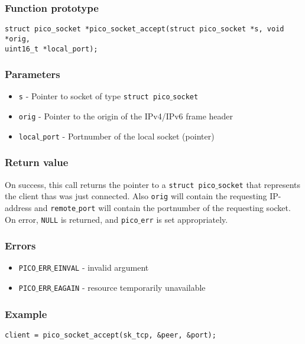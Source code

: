 \subsubsection*{Function prototype}
\begin{verbatim}
struct pico_socket *pico_socket_accept(struct pico_socket *s, void *orig,
uint16_t *local_port);
\end{verbatim}

\subsubsection*{Parameters}
\begin{itemize}[noitemsep]
\item \texttt{s} - Pointer to socket of type \texttt{struct pico$\_$socket}
\item \texttt{orig} - Pointer to the origin of the IPv4/IPv6 frame header
\item \texttt{local$\_$port} - Portnumber of the local socket (pointer)
\end{itemize}

\subsubsection*{Return value}
On success, this call returns the pointer to a \texttt{struct pico$\_$socket} that
represents the client thas was just connected. Also \texttt{orig} will contain the requesting
IP-address and \texttt{remote$\_$port} will contain the portnumber of the requesting socket.
On error, \texttt{NULL} is returned, and \texttt{pico$\_$err} is set appropriately.

\subsubsection*{Errors}
\begin{itemize}[noitemsep]
\item \texttt{PICO$\_$ERR$\_$EINVAL} - invalid argument
\item \texttt{PICO$\_$ERR$\_$EAGAIN} - resource temporarily unavailable
\end{itemize}

\subsubsection*{Example}
\begin{verbatim}
client = pico_socket_accept(sk_tcp, &peer, &port);
\end{verbatim}


